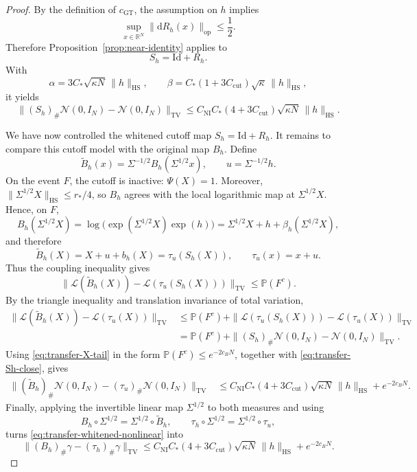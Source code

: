 \documentclass[11pt, reqno]{amsart}
\numberwithin{equation}{section}
\theoremstyle{remark}
\newcommand{\R}{\mathbb{R}}
\newcommand{\Prob}{\mathbb{P}}
\newcommand{\1}{\mathbf{1}}
\newcommand{\Id}{\mathrm{Id}}
\newcommand{\HS}{\mathrm{HS}}
\newcommand{\op}{\mathrm{op}}
\newcommand{\Law}{\mathcal{L}}
\newcommand{\TV}{\mathrm{TV}}
\newcommand{\dd}{\mathrm{d}}
\begin{document}
\begin{proof}
By the definition of \(c_{\mathrm{GT}}\), the assumption on \(h\) implies
\[
\sup_{x\in\R^N}\|\dd R_h(x)\|_{\op}\le \frac12.
\]
Therefore Proposition~\ref{prop:near-identity} applies to
\[
S_h=\Id+R_h.
\]
With
\[
\alpha=3C_\ast\sqrt{\kappa N}\,\|h\|_{\HS},
\qquad
\beta=C_\ast(1+3C_{\mathrm{cut}})\sqrt{\kappa}\,\|h\|_{\HS},
\]
it yields
\begin{equation}
\label{eq:transfer-Sh-close}
\|(S_h)_\#\mathcal N(0,I_N)-\mathcal N(0,I_N)\|_{\TV}
\le
C_{\mathrm{NI}}C_\ast(4+3C_{\mathrm{cut}})
\sqrt{\kappa N}\,\|h\|_{\HS}.
\end{equation}


We have now controlled the whitened cutoff map \(S_h=\Id+R_h\). It remains to
compare this cutoff model with the original map \(B_h\). Define
\[
\widetilde B_h(x)=\Sigma^{-1/2}B_h(\Sigma^{1/2}x),
\qquad
u=\Sigma^{-1/2}h.
\]
On the event \(F\), the cutoff is inactive: \(\Psi(X)=1\). Moreover,
\(\|\Sigma^{1/2}X\|_{\HS}\le r_\ast/4\), so \(B_h\) agrees with the local
logarithmic map at \(\Sigma^{1/2}X\). Hence, on \(F\),
\[
B_h(\Sigma^{1/2}X)
=
\log\!\bigl(\exp(\Sigma^{1/2}X)\exp(h)\bigr)
=
\Sigma^{1/2}X+h+\beta_h(\Sigma^{1/2}X),
\]
and therefore
\[
\widetilde B_h(X)
=
X+u+b_h(X)
=
\tau_u(S_h(X)),
\qquad
\tau_u(x)=x+u.
\]
Thus the coupling inequality gives
\[
\|\Law(\widetilde B_h(X))-\Law(\tau_u(S_h(X)))\|_{\TV}
\le
\Prob(F^c).
\]
By the triangle inequality and translation invariance of total variation,
\begin{align*}
\|\Law(\widetilde B_h(X))-\Law(\tau_u(X))\|_{\TV}
&\le
\Prob(F^c)
+
\|\Law(\tau_u(S_h(X)))-\Law(\tau_u(X))\|_{\TV}\\
&=
\Prob(F^c)
+
\|(S_h)_\#\mathcal N(0,I_N)-\mathcal N(0,I_N)\|_{\TV}.
\end{align*}
Using \eqref{eq:transfer-X-tail} in the form
\(\Prob(F^c)\le e^{-2c_BN}\), together with
\eqref{eq:transfer-Sh-close}, gives
\begin{align}
\|(\widetilde B_h)_\#\mathcal N(0,I_N)
-(\tau_u)_\#\mathcal N(0,I_N)\|_{\TV}
&\le
C_{\mathrm{NI}}C_\ast(4+3C_{\mathrm{cut}})
\sqrt{\kappa N}\,\|h\|_{\HS}
+
e^{-2c_BN}.
\label{eq:transfer-whitened-nonlinear}
\end{align}
Finally, applying the invertible linear map \(\Sigma^{1/2}\) to both measures and
using
\[
B_h\circ \Sigma^{1/2}=\Sigma^{1/2}\circ \widetilde B_h,
\qquad
\tau_h\circ \Sigma^{1/2}=\Sigma^{1/2}\circ \tau_u,
\]
turns \eqref{eq:transfer-whitened-nonlinear} into
\begin{equation}
\label{eq:transfer-nonlinear}
\|(B_h)_\#\gamma-(\tau_h)_\#\gamma\|_{\TV}
\le
C_{\mathrm{NI}}C_\ast(4+3C_{\mathrm{cut}})
\sqrt{\kappa N}\,\|h\|_{\HS}
+
e^{-2c_BN}.
\end{equation}



\end{proof}
\end{document}
